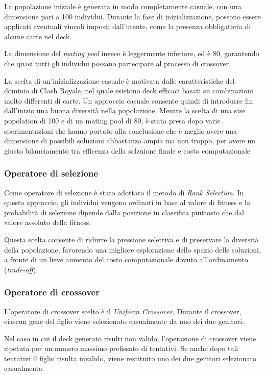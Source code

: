 \documentclass{article}
\begin{document}
La popolazione iniziale è generata in modo completamente casuale, con una dimensione pari a 100 individui. 
Durante la fase di inizializzazione, possono essere applicati eventuali vincoli imposti dall’utente, come la presenza obbligatoria di alcune carte nel deck.

La dimensione del \textit{mating pool} invece è leggermente inferiore, ed è 80, garantendo che quasi tutti gli individui possano partecipare al processo di crossover.

La scelta di un’inizializzazione casuale è motivata dalle caratteristiche del dominio di Clash Royale, nel quale esistono deck efficaci basati su combinazioni molto differenti di carte. 
Un approccio casuale consente quindi di introdurre fin dall’inizio una buona diversità nella popolazione.
Mentre la scelta di una size popolation di 100 e di un mating pool di 80, è stata presa dopo varie sperimentazioni che hanno portato alla conclusione che è meglio avere una dimensione di possibili soluzioni abbastanza ampia ma non troppo, per avere un giusto bilanciamento tra efficenza della solzuione finale e costo computazionale
\subsubsection{Operatore di selezione}

Come operatore di selezione è stato adottato il metodo di \textit{Rank Selection}. 
In questo approccio, gli individui vengono ordinati in base al valore di fitness e la probabilità di selezione dipende dalla posizione in classifica piuttosto che dal valore assoluto della fitness.

Questa scelta consente di ridurre la pressione selettiva e di preservare la diversità della popolazione, favorendo una migliore esplorazione dello spazio delle soluzioni, a fronte di un lieve aumento del costo computazionale dovuto all’ordinamento (\textit{trade-off}).

\subsubsection{Operatore di crossover}

L’operatore di crossover scelto è il \textit{Uniform Crossover}. 
Durante il crossover, ciascun gene del figlio viene selezionato casualmente da uno dei due genitori.

Nel caso in cui il deck generato risulti non valido, l’operazione di crossover viene ripetuta per un numero massimo prefissato di tentativi. 
Se anche dopo tali tentativi il figlio risulta invalido, viene restituito uno dei due genitori selezionato casualmente.
\end{document}
